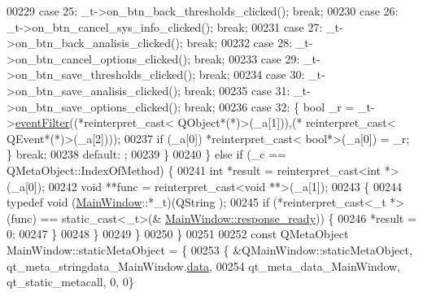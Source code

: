 \begin{DoxyCode}
00229         \textcolor{keywordflow}{case} 25: \_t->on\_btn\_back\_thresholds\_clicked(); \textcolor{keywordflow}{break};
00230         \textcolor{keywordflow}{case} 26: \_t->on\_btn\_cancel\_sys\_info\_clicked(); \textcolor{keywordflow}{break};
00231         \textcolor{keywordflow}{case} 27: \_t->on\_btn\_back\_analisis\_clicked(); \textcolor{keywordflow}{break};
00232         \textcolor{keywordflow}{case} 28: \_t->on\_btn\_cancel\_options\_clicked(); \textcolor{keywordflow}{break};
00233         \textcolor{keywordflow}{case} 29: \_t->on\_btn\_save\_thresholds\_clicked(); \textcolor{keywordflow}{break};
00234         \textcolor{keywordflow}{case} 30: \_t->on\_btn\_save\_analisis\_clicked(); \textcolor{keywordflow}{break};
00235         \textcolor{keywordflow}{case} 31: \_t->on\_btn\_save\_options\_clicked(); \textcolor{keywordflow}{break};
00236         \textcolor{keywordflow}{case} 32: \{ \textcolor{keywordtype}{bool} \_r = \_t->\hyperlink{a00006_a91df90bb5045775882c062cefdf903e9}{eventFilter}((*\textcolor{keyword}{reinterpret\_cast<} QObject*(*)\textcolor{keyword}{>}(\_a[1])),(*\textcolor{keyword}{
      reinterpret\_cast<} QEvent*(*)\textcolor{keyword}{>}(\_a[2])));
00237             \textcolor{keywordflow}{if} (\_a[0]) *\textcolor{keyword}{reinterpret\_cast<} \textcolor{keywordtype}{bool}*\textcolor{keyword}{>}(\_a[0]) = \_r; \}  \textcolor{keywordflow}{break};
00238         \textcolor{keywordflow}{default}: ;
00239         \}
00240     \} \textcolor{keywordflow}{else} \textcolor{keywordflow}{if} (\_c == QMetaObject::IndexOfMethod) \{
00241         \textcolor{keywordtype}{int} *result = \textcolor{keyword}{reinterpret\_cast<}\textcolor{keywordtype}{int} *\textcolor{keyword}{>}(\_a[0]);
00242         \textcolor{keywordtype}{void} **func = \textcolor{keyword}{reinterpret\_cast<}\textcolor{keywordtype}{void} **\textcolor{keyword}{>}(\_a[1]);
00243         \{
00244             \textcolor{keyword}{typedef} void (\hyperlink{a00006}{MainWindow}::*\_t)(QString );
00245             \textcolor{keywordflow}{if} (*reinterpret\_cast<\_t *>(func) == \textcolor{keyword}{static\_cast<}\_t\textcolor{keyword}{>}(&
      \hyperlink{a00006_a3f6396874778799cf07a7a0149e54977}{MainWindow::response\_ready})) \{
00246                 *result = 0;
00247             \}
00248         \}
00249     \}
00250 \}
00251 
00252 \textcolor{keyword}{const} QMetaObject MainWindow::staticMetaObject = \{
00253     \{ &QMainWindow::staticMetaObject, qt\_meta\_stringdata\_MainWindow.\hyperlink{a00015_a3d0c7851e40263cf43b0979ebc8eed83}{data},
00254       qt\_meta\_data\_MainWindow,  qt\_static\_metacall, 0, 0\}

\end{DoxyCode}
